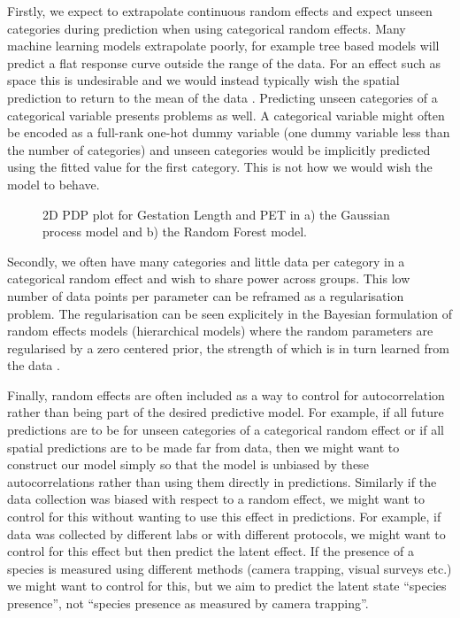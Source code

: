 \documentclass[10pt,]{article}
\begin{document}
Firstly, we expect to extrapolate continuous random effects and expect unseen categories during prediction when using categorical random effects.
Many machine learning models extrapolate poorly, for example tree based models will predict a flat response curve outside the range of the data.
For an effect such as space this is undesirable and we would instead typically wish the spatial prediction to return to the mean of the data \citep{rasmussen2004gaussian, hengl2018random}.
Predicting unseen categories of a categorical variable presents problems as well.
A categorical variable might often be encoded as a full-rank one-hot dummy variable (one dummy variable less than the number of categories) and unseen categories would be implicitly predicted using the fitted value for the first category.
This is not how we would wish the model to behave.

\begin{figure}[t!]
  \centering


  \label{fig:2d}
  \caption{
    2D PDP plot for Gestation Length and PET in a) the Gaussian process model and b) the Random Forest model.
  }
\end{figure}

Secondly, we often have many categories and little data per category in a categorical random effect and wish to share power across groups.
This low number of data points per parameter can be reframed as a regularisation problem.
The regularisation can be seen explicitely in the Bayesian formulation of random effects models (hierarchical models) where the random parameters are regularised by a zero centered prior, the strength of which is in turn learned from the data \citep{simpson2017penalising}.

Finally, random effects are often included as a way to control for autocorrelation rather than being part of the desired predictive model.
For example, if all future predictions are to be for unseen categories of a categorical random effect or if all spatial predictions are to be made far from data, then we might want to construct our model simply so that the model is unbiased by these autocorrelations rather than using them directly in predictions.
Similarly if the data collection was biased with respect to a random effect, we might want to control for this without wanting to use this effect in predictions.
For example, if data was collected by different labs or with different protocols, we might want to control for this effect but then predict the latent effect.
If the presence of a species is measured using different methods (camera trapping, visual surveys etc.) we might want to control for this, but we aim to predict the latent state ``species presence'', not ``species presence as measured by camera trapping''.
\end{document}
